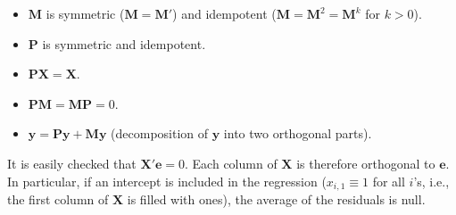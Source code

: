 \documentclass[
  12pt,
]{book}
\providecommand{\tightlist}{%
  \setlength{\itemsep}{0pt}\setlength{\parskip}{0pt}}
\theoremstyle{definition}
\theoremstyle{definition}
\theoremstyle{definition}
\theoremstyle{definition}
\theoremstyle{remark}
\begin{document}
\begin{itemize}
\tightlist
\item
  \(\mathbf{M}\) is symmetric (\(\mathbf{M} = \mathbf{M}'\)) and idempotent (\(\mathbf{M} = \mathbf{M}^2 = \mathbf{M}^k\) for \(k>0\)).
\item
  \(\mathbf{P}\) is symmetric and idempotent.
\item
  \(\mathbf{P}\mathbf{X} = \mathbf{X}\).
\item
  \(\mathbf{P} \mathbf{M} = \mathbf{M} \mathbf{P} = 0\).
\item
  \(\mathbf{y} = \mathbf{P}\mathbf{y} + \mathbf{M}\mathbf{y}\) (decomposition of \(\mathbf{y}\) into two orthogonal parts).
\end{itemize}

It is easily checked that \(\mathbf{X}'\mathbf{e}=0\). Each column of \(\mathbf{X}\) is therefore orthogonal to \(\mathbf{e}\). In particular, if an intercept is included in the regression (\(x_{i,1} \equiv 1\) for all \(i\)'s, i.e., the first column of \(\mathbf{X}\) is filled with ones), the average of the residuals is null.
\end{document}
